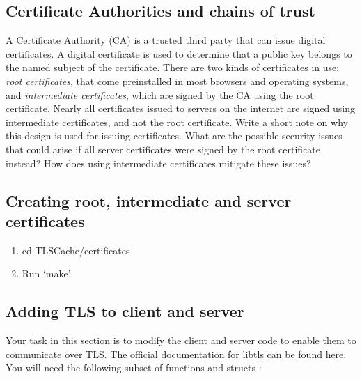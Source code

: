 \documentclass[11pt]{article}
\begin{document}
\subsection{Certificate Authorities and chains of trust}
A Certificate Authority (CA) is a trusted third party that can issue digital certificates. A digital certificate is used to determine that a public key belongs to the named subject of the certificate. There are two kinds of certificates in use: \textit{root certificates}, that come preinstalled in most browsers and operating systems, and \textit{intermediate certificates}, which are signed by the CA using the root certificate. Nearly all certificates issued to servers on the internet are signed using intermediate certificates, and not the root certificate. Write a short note on why this design is used for issuing certificates. What are the possible security issues that could arise if all server certificates were signed by the root certificate instead? How does using intermediate certificates mitigate these issues?

\subsection{Creating root, intermediate and server certificates}
\begin{enumerate}
    \item cd TLSCache/certificates
    \item Run `make'
\end{enumerate}

\subsection{Adding TLS to client and server}
Your task in this section is to modify the client and server code to enable them to communicate over TLS.
The official documentation for libtls can be found \href{https://man.openbsd.org/tls\_init.3}{here}. You will need the following subset of functions and structs :
\end{document}
